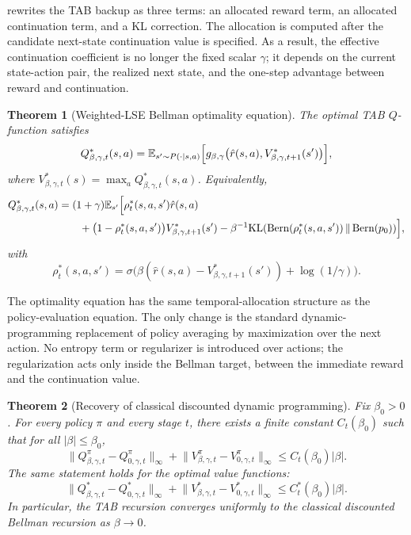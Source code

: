 \documentclass{article}
\newtheorem{theorem}{Theorem}[section]
\theoremstyle{remark}
\DeclareMathOperator{\Bern}{Bern}
\newcommand{\E}{\mathbb{E}}
\newcommand{\KL}{\mathrm{KL}}
\newcommand{\gbg}{g_{\beta,\gamma}}
\newcommand{\pprior}{p_0}
\newcommand{\KLbin}[2]{\KL\!\left(\Bern(#1)\,\middle\|\,\Bern(#2)\right)}
\begin{document}
 rewrites the TAB backup as three terms: an allocated reward
term, an allocated continuation term, and a KL correction. The allocation is computed after the
candidate next-state continuation value is specified. As a result, the effective continuation coefficient
is no longer the fixed scalar $\gamma$; it depends on the current state-action pair, the realized
next state, and the one-step advantage between reward and continuation.

\begin{theorem}[Weighted-LSE Bellman optimality equation]
\label{thm:lse-bellman-optimality}
The optimal TAB $Q$-function satisfies
\begin{equation}
Q^*_{\beta,\gamma,t}(s,a)
=
\E_{s'\sim P(\cdot\mid s,a)}
\Bigl[
\gbg\bigl(\hat r(s,a),V^*_{\beta,\gamma,t+1}(s')\bigr)
\Bigr],
\label{eq:lse-bellman-opt}
\end{equation}
where $V^*_{\beta,\gamma,t}(s)=\max_a Q^*_{\beta,\gamma,t}(s,a)$.
Equivalently,
\begin{equation}
\begin{aligned}
Q^*_{\beta,\gamma,t}(s,a)
&=
(1+\gamma)
\E_{s'}\Bigl[
\rho_t^*(s,a,s')\hat r(s,a) \\
&\qquad+
\bigl(1-\rho_t^*(s,a,s')\bigr)
V^*_{\beta,\gamma,t+1}(s')
-
\beta^{-1}\KLbin{\rho_t^*(s,a,s')}{\pprior}
\Bigr],
\end{aligned}
\label{eq:lse-bellman-opt-expanded}
\end{equation}
with
\[
\rho_t^*(s,a,s')
=
\sigma\!\bigl(
\beta(\hat r(s,a)-V^*_{\beta,\gamma,t+1}(s'))
+\log(1/\gamma)
\bigr).
\]
\end{theorem}

The optimality equation has the same temporal-allocation structure as the policy-evaluation equation.
The only change is the standard dynamic-programming replacement of policy averaging by maximization
over the next action. No entropy term or regularizer is introduced over actions; the regularization
acts only inside the Bellman target, between the immediate reward and the continuation value.

\begin{theorem}[Recovery of classical discounted dynamic programming]
\label{thm:recovery-classical}
Fix $\beta_0>0$. For every policy $\pi$ and every stage $t$, there exists a finite constant
$C_t(\beta_0)$ such that for all $|\beta|\le \beta_0$,
\begin{equation}
\bigl\|Q_{\beta,\gamma,t}^\pi - Q_{0,\gamma,t}^\pi\bigr\|_\infty
+
\bigl\|V_{\beta,\gamma,t}^\pi - V_{0,\gamma,t}^\pi\bigr\|_\infty
\le C_t(\beta_0)|\beta|.
\label{eq:recovery-rate}
\end{equation}
The same statement holds for the optimal value functions:
\[
\bigl\|Q_{\beta,\gamma,t}^* - Q_{0,\gamma,t}^*\bigr\|_\infty
+
\bigl\|V_{\beta,\gamma,t}^* - V_{0,\gamma,t}^*\bigr\|_\infty
\le C_t^*(\beta_0)|\beta|.
\]
In particular, the TAB recursion converges uniformly to the classical discounted Bellman recursion
as $\beta\to 0$.
\end{theorem}
\end{document}
